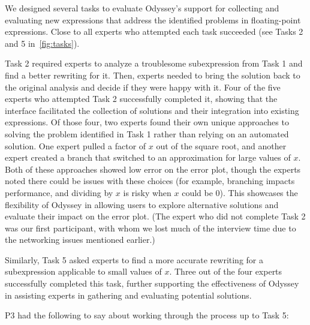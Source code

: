 We designed several tasks to evaluate Odyssey's support for collecting and
evaluating new expressions that address the identified problems in floating-point
expressions. Close to all experts who attempted each
task succeeded (see Tasks 2 and 5 in~\autoref{fig:tasks}).

Task 2 required experts to analyze a troublesome
subexpression from Task 1 and find a better rewriting for it. Then, experts needed
to bring the solution back to the original analysis and decide if they were
happy with it. Four of the five experts who attempted Task 2 successfully
completed it, showing that the interface facilitated the collection of solutions
and their integration into existing expressions. Of those four, two experts found their own unique approaches to solving the problem identified in Task 1 rather than relying on an automated solution. One expert pulled a factor of $x$ out of the square root, and another expert created a branch that switched to an approximation for large values of $x$. Both of these approaches showed low error on the error plot, though the experts noted there could be issues with these choices (for example, branching impacts performance, and dividing by $x$ is risky when $x$ could be 0). This showcases the flexibility of
Odyssey in allowing users to explore alternative solutions and evaluate their
impact on the error plot. 
(The expert who did not complete Task 2 was our first participant,
with whom we lost much of the interview time due to the networking issues mentioned earlier.)

Similarly, Task 5 asked experts to find a more accurate rewriting for a
subexpression applicable to small values of $x$. Three out of the four
experts successfully completed this task, further supporting the
effectiveness of Odyssey in assisting experts in gathering and evaluating
potential solutions.

P3 had the following to say about working through the process up to Task 5:

